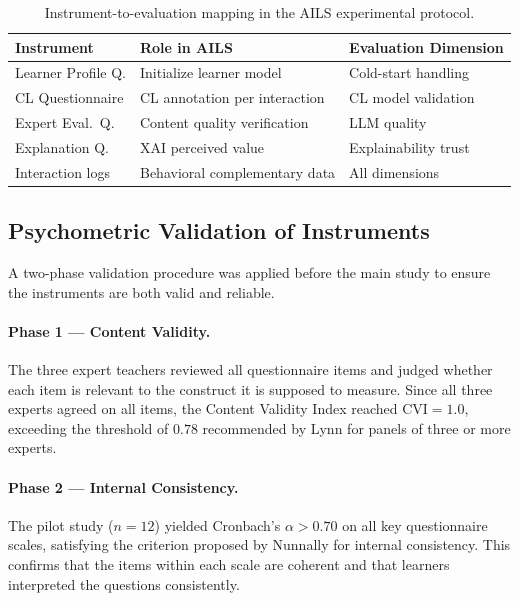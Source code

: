 \documentclass[ASNA,twocolumn]{USG} %
\begin{document}
\begin{table}[ht]
\caption{Instrument-to-evaluation mapping in the AILS experimental
protocol.}
\label{tab:instruments_summary}
\footnotesize %
\setlength{\tabcolsep}{4pt} %
\begin{tabularx}{\linewidth}{>{\raggedright\arraybackslash}p{2.6cm} >{\raggedright\arraybackslash}X >{\raggedright\arraybackslash}X}
\toprule
Instrument & Role in AILS & Evaluation Dimension \\
\midrule
Learner Profile Q. & Initialize learner model & Cold-start handling \\ \addlinespace
CL Questionnaire & CL annotation per interaction & CL model validation \\ \addlinespace
Expert Eval.\ Q. & Content quality verification & LLM quality \\ \addlinespace
Explanation Q. & XAI perceived value & Explainability trust \\ \addlinespace
Interaction logs & Behavioral complementary data & All dimensions \\
\bottomrule
\end{tabularx}
\end{table}

\subsection{Psychometric Validation of Instruments}
\label{sec:psychometric}

A two-phase validation procedure was applied before the main study
to ensure the instruments are both valid and reliable.

\paragraph{Phase 1 --- Content Validity.}
The three expert teachers reviewed all questionnaire items and judged
whether each item is relevant to the construct it is supposed to
measure. Since all three experts agreed on all items, the Content
Validity Index reached $\text{CVI} = 1.0$, exceeding the threshold
of $0.78$ recommended by Lynn \cite{Lynn1986} for panels of three or
more experts.

\paragraph{Phase 2 --- Internal Consistency.}
The pilot study ($n{=}12$) yielded Cronbach's $\alpha > 0.70$ on all
key questionnaire scales, satisfying the criterion proposed by
Nunnally \cite{Nunnally1978} for internal consistency. This confirms
that the items within each scale are coherent and that learners
interpreted the questions consistently.
\end{document}
